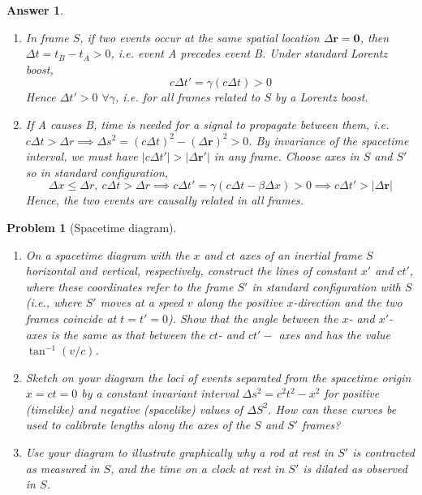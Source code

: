\documentclass[a4paper]{article}
\newtheorem{ans}{Answer}[subsection]
\theoremstyle{new}
\newtheorem{qns}{Problem}[section]
\begin{document}
\begin{ans}\leavevmode
\begin{enumerate}[label=(\alph*)]
\item In frame $S$, if two events occur at the same spatial location $\Delta\mathbf{r}=\boldsymbol{0}$, then $\Delta t=t_B-t_A>0$, i.e. event A precedes event B. Under standard Lorentz boost,
$$c\Delta t'=\gamma(c\Delta t)>0$$
Hence $\Delta t'>0$ $\forall\gamma$, i.e. for all frames related to $S$ by a Lorentz boost.
\item If A causes B, time is needed for a signal to propagate between them, i.e. $c\Delta t>\Delta r\implies\Delta s^2=(c\Delta t)^2-(\Delta\mathbf{r})^2>0$. By invariance of the spacetime interval, we must have $|c\Delta t'|>|\Delta\mathbf{r'}|$ in any frame. Choose axes in $S$ and $S'$ so in standard configuration,
$$\Delta x\leq\Delta r,~c\Delta t>\Delta r\implies c\Delta t'=\gamma(c\Delta t-\beta\Delta x)>0\implies c\Delta t'>|\Delta\mathbf{r}|$$
Hence, the two events are causally related in all frames.
\end{enumerate}
\end{ans}
\newpage
\begin{qns}[Spacetime diagram]\leavevmode
\begin{enumerate}[label=(\alph*)]
\item On a spacetime diagram with the $x$ and $ct$ axes of an inertial frame $S$ horizontal and vertical, respectively, construct the lines of constant $x'$ and $ct'$, where these coordinates refer to the frame $S'$ in standard configuration with $S$ (i.e., where $S'$ moves at a speed $v$ along the positive $x$-direction and the two frames coincide at $t = t' = 0$). Show that the angle between the $x$- and $x'$- axes is the same as that between the $ct$- and $ct'-$ axes and has the value $\tan^{-1}(v/c)$.
\item Sketch on your diagram the loci of events separated from the spacetime origin $x = ct = 0$ by a constant invariant interval $\Delta s^2=c^2t^2-x^2$ for positive (timelike) and negative (spacelike) values of $\Delta S^2$. How can these curves be used to calibrate lengths along the axes of the $S$ and $S'$ frames?
\item Use your diagram to illustrate graphically why a rod at rest in $S'$ is \textit{contracted} as measured in $S$, and the time on a clock at rest in $S'$ is \textit{dilated} as observed in $S$.
\end{enumerate}
\end{qns}
\end{document}
